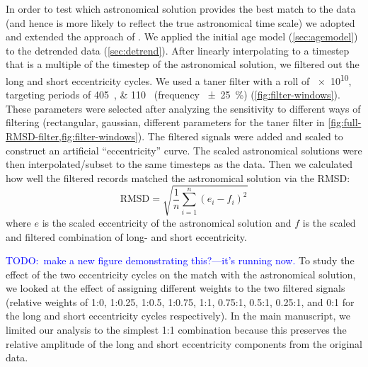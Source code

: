 \documentclass[draft]{agujournal2019}
\newcommand{\ijk}{\textcolor{blue}}
\begin{document}
In order to test which astronomical solution provides the best match to the data
(and hence is more likely to reflect the true astronomical time scale)
we adopted and extended the approach of .
We applied the initial age model (\cref{sec:agemodel}) to the detrended data (\cref{sec:detrend}).
After linearly interpolating to a timestep that is a multiple of the timestep of the astronomical solution,
we filtered out the long and short eccentricity cycles.
We used a taner filter with a roll of \num{e10}, targeting periods of \qtylist{405;110}{\kiloyear} (frequency \qty{\pm25}{\percent}) (\cref{fig:filter-windows}).
These parameters were selected after analyzing the sensitivity to different ways of filtering (rectangular, gaussian, different parameters for the taner filter in \cref{fig:full-RMSD-filter,fig:filter-windows}).
The filtered signals were added and scaled to construct an artificial ``eccentricity'' curve.
The scaled astronomical solutions were then interpolated/subset to the same timesteps as the data.
Then we calculated how well the filtered records matched the astronomical solution via the \gls{RMSD}:
\begin{equation}\label{eqn:rmsd}
    \text{RMSD} = \sqrt{\frac{1}{n}\sum_{i=1}^{n}(e_{i} - f_{i})^{2}}
\end{equation}
where \(e\) is the scaled eccentricity of the astronomical solution and \(f\) is the scaled and filtered combination of long- and short eccentricity.

\ijk{TODO:\ make a new figure demonstrating this?---it's running now.}
To study the effect of the two eccentricity cycles on the match with the astronomical solution,
we looked at the effect of assigning different weights to the two filtered signals
(relative weights of 1:0, 1:0.25, 1:0.5, 1:0.75, 1:1, 0.75:1, 0.5:1, 0.25:1, and 0:1 for the long and short eccentricity cycles respectively).
In the main manuscript, we limited our analysis to the simplest 1:1 combination because this preserves the relative amplitude of the long and short eccentricity components from the original data.
\end{document}
